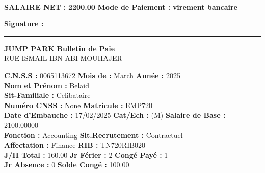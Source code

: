 \documentclass[a4paper,landscape]{article}
\begin{document}
\begin{minipage}{0.48\linewidth}
{}
\\[0.25cm]





\noindent
\textbf{SALAIRE NET :}  \textbf{ 2200.00 } \hfill \textbf{Mode de Paiement :} \textbf{ virement bancaire }\\[0.5cm]

\begin{flushright}
    \textbf{Signature :} \rule{5cm}{0.5pt}
\end{flushright}
\end{minipage}
\hfill
\begin{minipage}{0.48\linewidth} %
        \noindent
\textbf{JUMP PARK}\hfill
\textbf{Bulletin de Paie} \\[0.25cm]
RUE ISMAIL IBN ABI MOUHAJER


\noindent
\textbf{C.N.S.S :} {0065113672} \hfill \textbf{Mois de :} March \hfill \textbf{Année :} 2025\\[0.2cm]


\noindent
\noindent
\textbf{Nom et Prénom :} Belaid\\[0.1cm]
\textbf{Sit-Familiale :} Celibataire\\[0.1cm]
\textbf{Numéro CNSS :} None \hfill \textbf{Matricule :} EMP720\\[0.1cm]
\textbf{Date d'Embauche :} 17/02/2025 \hfill 
\textbf{Cat/Ech :} (M) \hfill 
\textbf{Salaire de Base :} 2100.00000\\[0.1cm]
\textbf{Fonction :} Accounting \hfill 
\textbf{Sit.Recrutement :} Contractuel\\[0.1cm]
\textbf{Affectation :} Finance \hfill 
\textbf{RIB :} TN720RIB020\\[0.1cm]
\textbf{J/H Total :} 160.00 \hfill
\textbf{Jr Férier :} 2 \hfill
\textbf{Congé Payé :} 1\\[0.1cm]
\textbf{Jr Absence :} 0 \hfill
\textbf{Solde Congé :} 100.00




\end{minipage}
\end{document}
